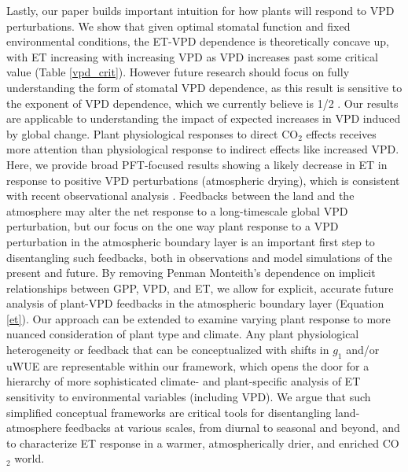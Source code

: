\documentclass[draft,linenumbers]{agujournal}
\begin{document}
Lastly, our paper builds important intuition for how plants will
respond to VPD perturbations. We show that given optimal stomatal
function and fixed environmental conditions, the ET-VPD dependence is
theoretically concave up, with ET increasing with increasing VPD as
VPD increases past some critical value (Table \ref{vpd_crit}). However
future research should focus on fully understanding the form of
stomatal VPD dependence, as this result is sensitive to the exponent of
VPD dependence, which we currently believe is 1/2 \citep{MEDLYN_2011,
  Zhou_2014}. Our results are applicable to understanding the impact
of  expected increases in VPD
induced by global change.  Plant physiological responses to direct
CO$_2$ effects \citep[e.g.,][]{Swann_2016, Lemordant_2018} receives more attention
than physiological response to indirect effects like increased
VPD. Here, we provide broad PFT-focused results showing a likely
decrease in ET in response to positive VPD perturbations (atmospheric
drying), which is consistent with recent observational analysis
\citep[e.g.,][]{Rigden_2017}. Feedbacks between the land and the
atmosphere may alter the net response to a long-timescale global VPD perturbation,
but our focus on the one way plant response to a VPD perturbation in
the atmospheric boundary layer is an important first step to
disentangling such feedbacks, both in observations and model
simulations of the present and future. By removing Penman Monteith's
dependence on implicit relationships between GPP, VPD, and ET, we
allow for explicit, accurate future analysis of plant-VPD feedbacks
in the atmospheric boundary layer (Equation \ref{et}). Our approach
can be extended to examine varying plant response to more nuanced
consideration of plant type and climate. Any plant physiological
heterogeneity or feedback that can be conceptualized with shifts in $g_1$
\citep[e.g.][]{Lin_2015, Medlyn_2017} and/or uWUE
\citep[e.g.][]{Zhou_2014} are representable within our framework, which
opens the door for a hierarchy of more sophisticated climate- and
plant-specific analysis of ET sensitivity to environmental variables
(including VPD). We argue that such simplified conceptual frameworks
are critical tools for disentangling land-atmosphere feedbacks at
various scales, from diurnal to seasonal and beyond, and to
characterize ET response in a warmer, atmospherically drier, and
enriched CO$_2$ world.
\end{document}

